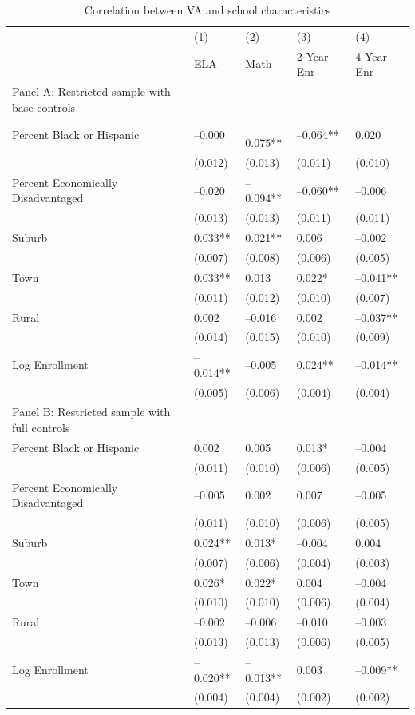 \begin{table}[tbp] \centering
{}

\caption{Correlation between VA and school characteristics}
{\footnotesize
\begin{tabularx}{\linewidth}{lCCCC}

\toprule
&{(1)}&{(2)}&{(3)}&{(4)} \tabularnewline
{} & ELA & Math & 2 Year Enr & 4 Year Enr \tabularnewline
\midrule \addlinespace[\belowrulesep]
Panel A: Restricted sample with base controls&&&& \tabularnewline
\midrule Percent Black or Hispanic&--0.000&--0.075**&--0.064**&0.020 \tabularnewline
&(0.012)&(0.013)&(0.011)&(0.010) \tabularnewline
\midrule Percent Economically Disadvantaged&--0.020&--0.094**&--0.060**&--0.006 \tabularnewline
&(0.013)&(0.013)&(0.011)&(0.011) \tabularnewline
\midrule Suburb&0.033**&0.021**&0.006&--0.002 \tabularnewline
&(0.007)&(0.008)&(0.006)&(0.005) \tabularnewline
Town&0.033**&0.013&0.022*&--0.041** \tabularnewline
&(0.011)&(0.012)&(0.010)&(0.007) \tabularnewline
Rural&0.002&--0.016&0.002&--0.037** \tabularnewline
&(0.014)&(0.015)&(0.010)&(0.009) \tabularnewline
\midrule Log Enrollment&--0.014**&--0.005&0.024**&--0.014** \tabularnewline
&(0.005)&(0.006)&(0.004)&(0.004) \tabularnewline
\midrule \midrule Panel B: Restricted sample with full controls&&&& \tabularnewline
\midrule Percent Black or Hispanic&0.002&0.005&0.013*&--0.004 \tabularnewline
&(0.011)&(0.010)&(0.006)&(0.005) \tabularnewline
\midrule Percent Economically Disadvantaged&--0.005&0.002&0.007&--0.005 \tabularnewline
&(0.011)&(0.010)&(0.006)&(0.005) \tabularnewline
\midrule Suburb&0.024**&0.013*&--0.004&0.004 \tabularnewline
&(0.007)&(0.006)&(0.004)&(0.003) \tabularnewline
Town&0.026*&0.022*&0.004&--0.004 \tabularnewline
&(0.010)&(0.010)&(0.006)&(0.004) \tabularnewline
Rural&--0.002&--0.006&--0.010&--0.003 \tabularnewline
&(0.013)&(0.013)&(0.006)&(0.005) \tabularnewline
\midrule Log Enrollment&--0.020**&--0.013**&0.003&--0.009** \tabularnewline
&(0.004)&(0.004)&(0.002)&(0.002) \tabularnewline
\bottomrule 

\end{tabularx}
}
\end{table}
